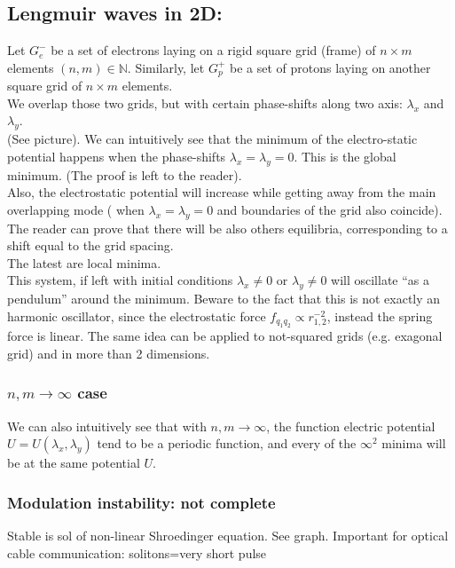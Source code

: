 \documentclass[a4paper,11pt]{article}
\begin{document}
\subsection{Lengmuir waves in 2D:}
Let $G_e^-$ be a set of electrons laying on a rigid square grid (frame) of $n \times m$ elements $(n,m) \in \mathbb{N}$. Similarly, let $G_p^+$ be a set of protons laying on another square grid of  $n \times m$ elements. \\
We overlap those two grids, but with certain phase-shifts along two axis: $\lambda_x$ and $\lambda_y$. \\ (See picture). %
We can intuitively see that the minimum of the electro-static potential happens when the phase-shifts $\lambda_x=\lambda_y=0$. 
This is the global minimum. (The proof is left to the reader). \\
Also, the electrostatic potential will increase while getting away from the main overlapping mode ( when $\lambda_x=\lambda_y=0$ and boundaries of the grid also coincide).
The reader can prove that there will be also others equilibria, corresponding to a shift equal to the grid spacing. \\ The latest are local minima.\\ %

This system, if left with initial conditions $\lambda_x \neq 0 $ or $\lambda_y \neq 0 $ will oscillate ``as a pendulum'' around the minimum. 
Beware to the fact that this is not exactly an harmonic oscillator, since the electrostatic force $f_{q_1 q_2} \propto r_{1,2}^{-2}$, instead the spring force is linear.
The same idea can be applied to not-squared grids (e.g. exagonal grid) and in more than 2 dimensions.

\subsubsection{$n,m \rightarrow \infty$ case} 
We can also intuitively see that with $n,m \rightarrow \infty$, the function electric potential $U=U(\lambda_x,\lambda_y)$ tend to be a periodic function, and every of the $\infty^2$ minima will be at the same potential $U$.

\subsubsection{Modulation instability: not complete}
Stable is sol of non-linear Shroedinger equation. See graph.
Important for optical cable communication: solitons=very short pulse
\end{document}
